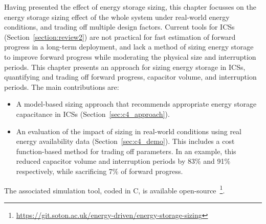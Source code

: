 Having presented the effect of energy storage sizing, this chapter focusses on the energy storage sizing effect of the whole system under real-world energy conditions, and trading off multiple design factors. 
Current tools for ICSs (Section~\ref{section:review2}) are not practical for fast estimation of forward progress in a long-term deployment, and lack a method of sizing energy storage to improve forward progress while moderating the physical size and interruption periods. 
This chapter presents an approach for sizing energy storage in ICSs, quantifying and trading off forward progress, capacitor volume, and interruption periods. 
The main contributions are:
\begin{itemize}
    \item A model-based sizing approach that recommends appropriate energy storage capacitance in ICSs (Section~\ref{sec:c4_approach}).
    \item An evaluation of the impact of sizing in real-world conditions using real energy availability data (Section~\ref{sec:c4_demo}). 
    This includes a cost function-based method for trading off parameters. 
    In an example, this reduced capacitor volume and interruption periods by 83\% and 91\% respectively, while sacrificing 7\% of forward progress.
\end{itemize}

The associated simulation tool, coded in C, is available open-source~\footnote{\url{https://git.soton.ac.uk/energy-driven/energy-storage-sizing}}. 
